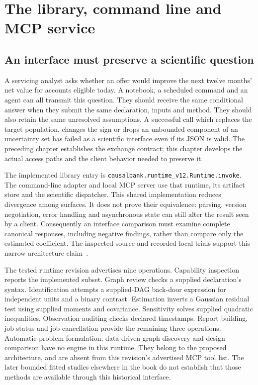 \chapter{The library, command line and MCP service}
\label{in:surfaces}
\label{exec13:i2-start}

\section{An interface must preserve a scientific question}

A servicing analyst asks whether an offer would improve the next twelve
months' net value for accounts eligible today. A notebook, a scheduled command
and an agent can all transmit this question. They should receive the same
conditional answer when they submit the same declaration, inputs and method.
They should also retain the same unresolved assumptions. A successful call
which replaces the target population, changes the sign or drops an unbounded
component of an uncertainty set has failed as a scientific interface even if
its JSON is valid. The preceding chapter establishes the exchange contract;
this chapter develops the actual access paths and the client behavior needed
to preserve it.

The implemented library entry is
\texttt{causalbank.runtime\_v12.Runtime.invoke}. The command-line adapter and
local MCP server use that runtime, its artifact store and the scientific
dispatcher. This shared implementation reduces divergence among surfaces.
It does not prove their equivalence: parsing, version negotiation, error
handling and asynchronous state can still alter the result seen by a client.
Consequently an interface comparison must examine complete canonical responses,
including negative findings, rather than compare only the estimated coefficient.
The inspected source and recorded local trials support this narrow architecture
claim~\citep{v12_in_runtime,exec13_i2_examples}.

The tested runtime revision advertises nine operations. Capability inspection reports the
implemented subset. Graph review checks a supplied declaration's syntax.
Identification attempts a supplied-DAG back-door expression for independent
units and a binary contrast. Estimation inverts a Gaussian residual test using
supplied moments and covariance. Sensitivity solves supplied quadratic
inequalities. Observation auditing checks declared timestamps. Report building,
job status and job cancellation provide the remaining three operations.
Automatic problem formulation, data-driven graph discovery and design
comparison have no engine in this runtime. They belong to the proposed
architecture, and are absent from this revision's advertised MCP tool list. The later bounded fitted studies elsewhere in the book do not establish that those methods are available through this historical interface.

